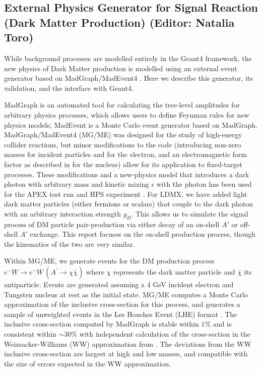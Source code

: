 
\subsection{External Physics Generator for Signal Reaction (Dark Matter Production) (Editor: Natalia Toro)}
While background processes are modelled entirely in the Geant4 framework, the new physics of Dark Matter production is modelled using an external event generator based on MadGraph/MadEvent4 \cite{MG4}.  Here we describe this generator, its validation, and the interface with Geant4.

MadGraph is an automated tool for calculating the tree-level amplitudes for arbitrary physics processes, which allows users to define Feynman rules for new physics models; MadEvent is a Monte Carlo event generator based on MadGraph.  MadGraph/MadEvent4 (MG/ME) was designed for the study of high-energy collider reactions, but minor modifications to the code (introducing non-zero masses for incident particles and for the electron, and an electromagnetic form factor as described in \cite{Tsai} for the nucleus) allow for its application to fixed-target processes.  These modifications and a new-physics model that introduces a dark photon with arbitrary mass and kinetic mixing $\epsilon$ with the photon has been used for  the APEX test run \cite{APEXtest} and HPS experiment \cite{HPStest}.  For LDMX, we have added light dark matter particles (either fermions or scalars) that couple to the dark photon with an arbitrary interaction strength $g_D$.  This allows us to simulate the signal process of DM particle pair-production via either decay of an on-shell $A'$ or off-shell $A'$ exchange.   This report focuses on the on-shell production process, though the kinematics of the two are very similar.  


Within MG/ME, we generate events for the DM production process $e^- W \rightarrow e^- W \,(A^\prime \rightarrow \chi \bar\chi)$ where $\chi$ represents the dark matter particle and $\bar\chi$ its antiparticle. Events are generated assuming a 4 GeV incident electron and Tungsten nucleus at rest as the initial state.  MG/ME computes a Monte Carlo approximation of the inclusive cross-section for this process, and generates a sample of unweighted events in the Les Houches Event (LHE) format \cite{LHE}.  The inclusive cross-section computed by MadGraph is stable within $1\%$ and is consistent within $\sim 30\%$ with independent calculation of the cross-section in the Weizsacker-Williams (WW) approximation from \cite{Andreas09}.  The deviations from the WW inclusive cross-section are largest at high and low masses, and compatible with the size of errors expected in the WW approximation.

